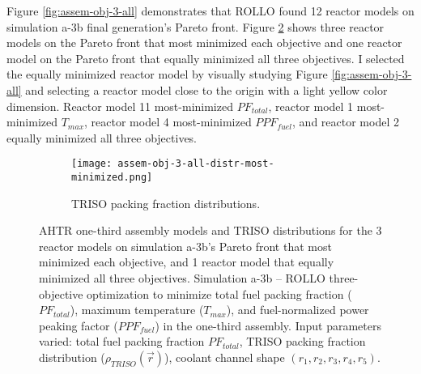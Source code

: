 Figure \ref{fig:assem-obj-3-all} demonstrates that \gls{ROLLO} found 12 reactor models 
on simulation a-3b final generation's Pareto front. 
Figure \ref{fig:assem-obj-3-all-most-minimized} shows three reactor models on the 
Pareto front that most minimized each objective and one reactor model on the 
Pareto front that equally minimized all three objectives. 
I selected the equally minimized reactor model by visually studying Figure 
\ref{fig:assem-obj-3-all} and selecting a reactor model close to the origin 
with a light yellow color dimension. 
Reactor model 11 most-minimized $PF_{total}$, reactor model 1 most-minimized $T_{max}$, 
reactor model 4 most-minimized $PPF_{fuel}$, and reactor model 2 equally minimized 
all three objectives. 
\begin{figure}[htbp!]
    \centering
    \begin{subfigure}{\textwidth}
    \centering
    \texttt{[image: assem-obj-3-all-distr-most-minimized.png]}
    \caption{TRISO packing fraction distributions.}
    \label{fig:assem-obj-3-all-most-minimized-distr}
    \end{subfigure}
    \caption{AHTR one-third assembly models and TRISO distributions for the 3 reactor 
    models on simulation a-3b's Pareto front that most minimized each objective, and 
    1 reactor model that equally minimized all three objectives.
    Simulation a-3b -- ROLLO three-objective optimization to minimize 
    total fuel packing fraction ($PF_{total}$), maximum temperature ($T_{max}$), 
    and fuel-normalized power peaking factor ($PPF_{fuel}$) in the one-third assembly. 
    Input parameters varied: total fuel packing fraction $PF_{total}$, 
    TRISO packing fraction distribution ($\rho_{TRISO}(\vec{r})$), 
    coolant channel shape $(r_1, r_2, r_3, r_4, r_5)$.}
    \label{fig:assem-obj-3-all-most-minimized}
\end{figure}
